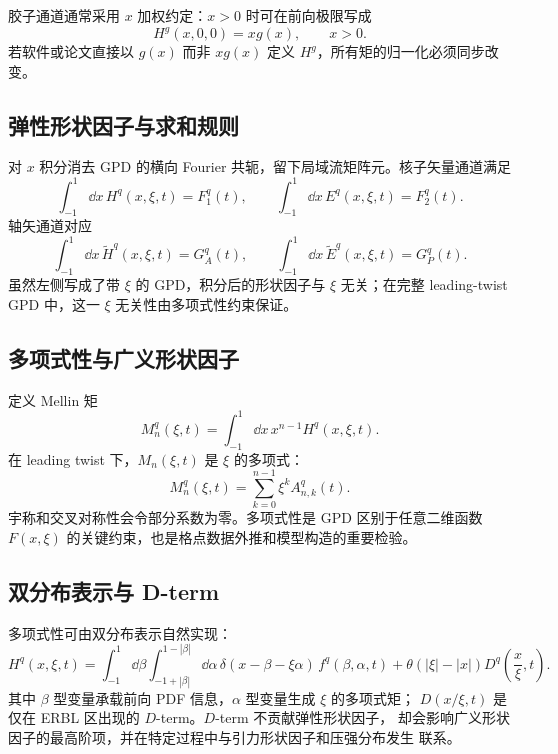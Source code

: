 \documentclass[12pt,a4paper]{ctexart}
\theoremstyle{definition}
\begin{document}
胶子通道通常采用 $x$ 加权约定：$x>0$ 时可在前向极限写成
\begin{equation}
H^g(x,0,0)=xg(x),\qquad x>0 .
\label{eq:gluon-forward-limit}
\end{equation}
若软件或论文直接以 $g(x)$ 而非 $xg(x)$ 定义 $H^g$，所有矩的归一化必须同步改变。

\subsection{弹性形状因子与求和规则}

对 $x$ 积分消去 GPD 的横向 Fourier 共轭，留下局域流矩阵元。核子矢量通道满足
\begin{equation}
\int_{-1}^{1}\dd x\,H^q(x,\xi,t)=F_1^q(t),\qquad
\int_{-1}^{1}\dd x\,E^q(x,\xi,t)=F_2^q(t).
\label{eq:dirac-pauli-sumrules}
\end{equation}
轴矢通道对应
\begin{equation}
\int_{-1}^{1}\dd x\,\widetilde H^q(x,\xi,t)=G_A^q(t),\qquad
\int_{-1}^{1}\dd x\,\widetilde E^q(x,\xi,t)=G_P^q(t).
\label{eq:axial-sumrules}
\end{equation}
虽然左侧写成了带 $\xi$ 的 GPD，积分后的形状因子与 $\xi$ 无关；在完整
leading-twist GPD 中，这一 $\xi$ 无关性由多项式性约束保证。

\subsection{多项式性与广义形状因子}

定义 Mellin 矩
\begin{equation}
M_n^q(\xi,t)=\int_{-1}^{1}\dd x\,x^{n-1}H^q(x,\xi,t).
\label{eq:gpd-mellin}
\end{equation}
在 leading twist 下，$M_n(\xi,t)$ 是 $\xi$ 的多项式：
\begin{equation}
M_n^q(\xi,t)
=\sum_{k=0}^{n-1}\xi^k A_{n,k}^q(t).
\label{eq:polynomiality}
\end{equation}
宇称和交叉对称性会令部分系数为零。多项式性是 GPD 区别于任意二维函数
$F(x,\xi)$ 的关键约束，也是格点数据外推和模型构造的重要检验。

\subsection{双分布表示与 D-term}

多项式性可由双分布表示自然实现：
\begin{equation}
H^q(x,\xi,t)
=\int_{-1}^{1}\dd\beta\int_{-1+|\beta|}^{1-|\beta|}\dd\alpha\,
\delta(x-\beta-\xi\alpha)\,f^q(\beta,\alpha,t)
+\theta(|\xi|-|x|)D^q\!\left(\frac{x}{\xi},t\right).
\label{eq:double-distribution}
\end{equation}
其中 $\beta$ 型变量承载前向 PDF 信息，$\alpha$ 型变量生成 $\xi$ 的多项式矩；
$D(x/\xi,t)$ 是仅在 ERBL 区出现的 $D$-term。$D$-term 不贡献弹性形状因子，
却会影响广义形状因子的最高阶项，并在特定过程中与引力形状因子和压强分布发生
联系。
\end{document}
